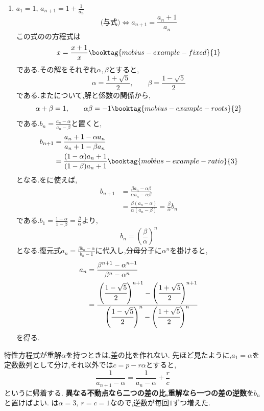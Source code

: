 \begin{enumerate}[label=(\arabic*),parsep=3pt,format=\bookitemlink{example-mobius-1}{solution}{problem}]
\begin{align*}
    \end{align*}
    となる.正の$b_n$が続くので,$b_n$も元の分母$b_n+1$も0でない.
    逆数を取れば,
    \begin{align*}
      \frac1{b_{n+1}}&=\frac1{b_n}+1,\\
      \frac1{b_n}&=\frac12+(n-1)=\frac{2n-1}{2}
    \end{align*}
    である.従って,
    \[
      a_n=3+b_n=3+\frac2{2n-1}=\frac{6n-1}{2n-1}
    \]
    を得る.
  \item $a_1=1,\, a_{n+1}=1+\frac1{a_n}$\\
    \[
      \text{(与式)}\iff a_{n+1}=\frac{a_n+1}{a_n}
    \]
    この式のの方程式は
    \[
      x=\frac{x+1}{x}\booktag{mobius-example-fixed}{1}
    \]
    である.その解をそれぞれ$\alpha,\beta$とすると,
    \[
      \alpha=\frac{1+\sqrt5}{2},\qquad
      \beta=\frac{1-\sqrt5}{2}
    \]
    である.またについて,解と係数の関係から,
    \[
      \alpha+\beta=1,\qquad \alpha\beta=-1
      \booktag{mobius-example-roots}{2}
    \]
    である.$b_n=\frac{a_n-\alpha}{a_n-\beta}$と置くと,
    \begin{align*}
      b_{n+1}&=\frac{a_n+1-\alpha a_n}{a_n+1-\beta a_n}\\
      &=\frac{(1-\alpha)a_n+1}{(1-\beta)a_n+1}
      \booktag{mobius-example-ratio}{3}
    \end{align*}
    となる.をに使えば,
    \begin{align*}
      b_{n+1}&=\frac{\beta a_n-\alpha\beta}{\alpha a_n-\alpha\beta}\\
      &=\frac{\beta(a_n-\alpha)}{\alpha(a_n-\beta)}
      =\frac\beta\alpha b_n
    \end{align*}
    である.$b_1=\frac{1-\alpha}{1-\beta}=\frac{\beta}{\alpha}$より,
    \[
      b_n=\left(\frac\beta\alpha\right)^n
    \]
    となる.復元式$a_n=\frac{\beta b_n-\alpha}{b_n-1}$に代入し,分母分子に$\alpha^n$を掛けると,
    \begin{align*}
      a_n&=\frac{\beta^{n+1}-\alpha^{n+1}}{\beta^n-\alpha^n}\\
      &=\cfrac{\left(\cfrac{1-\sqrt5}{2}\right)^{n+1}-\left(\cfrac{1+\sqrt5}{2}\right)^{n+1}}
      {\left(\cfrac{1-\sqrt5}{2}\right)^n-\left(\cfrac{1+\sqrt5}{2}\right)^n}
    \end{align*}
    を得る.
\end{enumerate}
  特性方程式が重解$\alpha$を持つときは,差の比を作れない.
  先ほど見たように,$a_1=\alpha$を定数数列として分け,それ以外では$c=p-r\alpha$とすると,
  \[
    \frac1{a_{n+1}-\alpha}
    =\frac1{a_n-\alpha}+\frac rc
  \]
  というに帰着する.
  \textbf{異なる不動点なら二つの差の比,重解なら一つの差の逆数}を$b_n$と置けばよい.
  は$\alpha=3,\ r=c=1$なので,逆数が毎回$1$ずつ増えた.


